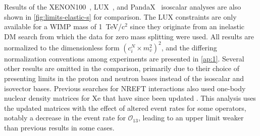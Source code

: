 \documentclass[reprint, showpacs,
preprintnumbers,
amsmath,amssymb,
aps, floatfix,
superscriptaddress,
prd, nofootinbib]{revtex4-1}
\begin{document}
\par
Results of the XENON100~\cite{Xenon100:EFT_2017}, LUX~\cite{LUX:EFTR4_2021}, and PandaX~\cite{PandaX2:SD_EFT_2019} isoscalar analyses are also shown in \autoref{fig:limits-elastic-s} for comparison. 
The LUX constraints are only available for a WIMP mass of 1~TeV/c$^2$ since they originate from an inelastic DM search from which the data for zero mass splitting were used.
All results are normalized to the dimensionless form $(c_i^N \times m_v^2)^2$, and the differing normalization conventions among experiments are presented in \cref{ap:1}. 
Several other results are omitted in the comparison, primarily due to their choice of presenting limits in the proton and neutron bases instead of the isoscalar and isovector bases.
Previous searches for NREFT interactions also used one-body nuclear density matrices for Xe that have since been updated \cite{Haxton_OneBody}. 
This analysis uses the updated matrices with the effect of altered event rates for some operators, notably a decrease in the event rate for $\mathcal{O}_{13}$, leading to an upper limit weaker than previous results in some cases. 
\end{document}
